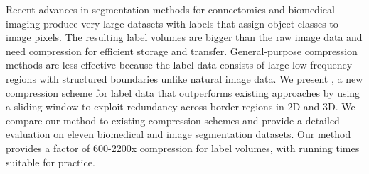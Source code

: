 Recent advances in segmentation methods for connectomics and biomedical imaging produce very large datasets with labels that assign object classes to image pixels. The resulting label volumes are bigger than the raw image data and need compression for efficient storage and transfer. General-purpose compression methods are less effective because the label data consists of large low-frequency regions with structured boundaries unlike natural image data. We present \appName, a new compression scheme for label data that outperforms existing approaches by using a sliding window to exploit redundancy across border regions in 2D and 3D. We compare our method to existing compression schemes and provide a detailed evaluation on eleven biomedical and image segmentation datasets. Our method provides a factor of 600-2200x compression for label volumes, with running times suitable for practice.
